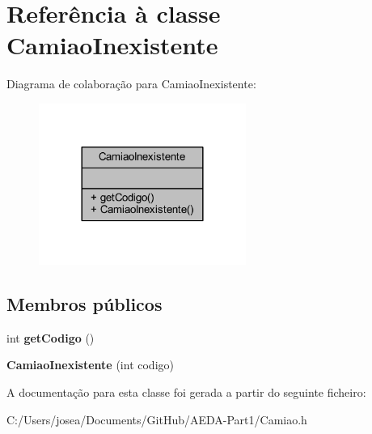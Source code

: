 \hypertarget{class_camiao_inexistente}{}\section{Referência à classe Camiao\+Inexistente}
\label{class_camiao_inexistente}


Diagrama de colaboração para Camiao\+Inexistente\+:
\nopagebreak
\begin{figure}[H]
\begin{center}
\leavevmode
\includegraphics[width=192pt]{class_camiao_inexistente__coll__graph}
\end{center}
\end{figure}
\subsection*{Membros públicos}
\begin{DoxyCompactItemize}
\item 
\hypertarget{class_camiao_inexistente_afbb6e45281a2b470d12dc576f06a35c4}{}int {\bfseries get\+Codigo} ()\label{class_camiao_inexistente_afbb6e45281a2b470d12dc576f06a35c4}

\item 
\hypertarget{class_camiao_inexistente_ad7916f06574444a714938a4abb91c211}{}{\bfseries Camiao\+Inexistente} (int codigo)\label{class_camiao_inexistente_ad7916f06574444a714938a4abb91c211}

\end{DoxyCompactItemize}


A documentação para esta classe foi gerada a partir do seguinte ficheiro\+:\begin{DoxyCompactItemize}
\item 
C\+:/\+Users/josea/\+Documents/\+Git\+Hub/\+A\+E\+D\+A-\/\+Part1/Camiao.\+h\end{DoxyCompactItemize}
